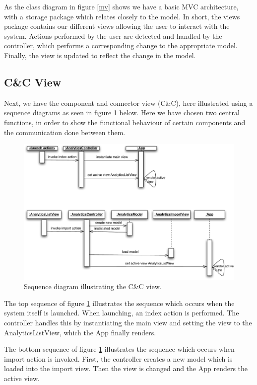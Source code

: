 As the class diagram in figure \ref{mv} shows we have a basic MVC architecture, with a storage package which relates closely to the model. In short, the views package contains our different views allowing the user to interact with the system. Actions performed by the user are detected and handled by the controller, which performs a corresponding change to the appropriate model. Finally, the view is updated to reflect the change in the model. 

\subsection{C\&C View}

Next, we have the component and connector view (C\&C), here illustrated using a sequence diagrams as seen in figure \ref{cc} below. Here we have chosen two central functions, in order to show the functional behaviour of certain components and the communication done between them.

\begin{figure}[h!]
  \centering
    \includegraphics[width=1.0\textwidth]{images/cc_view.pdf}
  \caption{Sequence diagram illustrating the C\&C view.}
  \label{cc}
\end{figure}

The top sequence of figure \ref{cc} illustrates the sequence which occurs when the system itself is launched. When launching, an index action is performed. The controller handles this by instantiating the main view and setting the view to the AnalyticsListView, which the App finally renders.

The bottom sequence of figure \ref{cc} illustrates the sequence which occurs when import action is invoked. First, the controller creates a new model which is loaded into the import view. Then the view is changed and the App renders the active view. 


